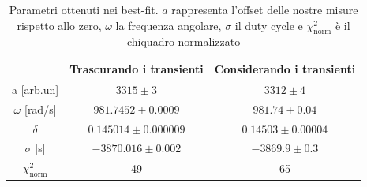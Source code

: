 \documentclass{article}
\begin{document}
            \begin{table}[H]
                \centering
                \begin{tabular}{ccc}
                    \hline
                               & Trascurando i transienti              &Considerando i transienti\\
                    \hline
                    a [arb.un]          & $3315 \pm 3$                          & $3312\pm 4$    \\
                    $\omega$ [rad/s]    & $981.7452\pm 0.0009$                  & $981.74\pm 0.04$ \\
                    $\delta$            & $0.145014\pm 0.000009$                & $0.14503\pm 0.00004$   \\
                    $\sigma$ [s]        & $-3870.016 \pm 0.002$                 & $-3869.9 \pm 0.3$  \\
                    $\chi^{2}_{\text{norm}}$   & 49                                    & 65 \\
                    \hline
                \end{tabular}
                \caption{Parametri ottenuti nei best-fit. $a$ rappresenta l'offset delle nostre misure rispetto allo zero, $\omega$ la frequenza angolare, $\sigma$ il duty cycle e $\chi^2_{\text{norm}}$ è il chiquadro normalizzato}
                \label{tab:bestfit_triangle}
            \end{table}
\end{document}
